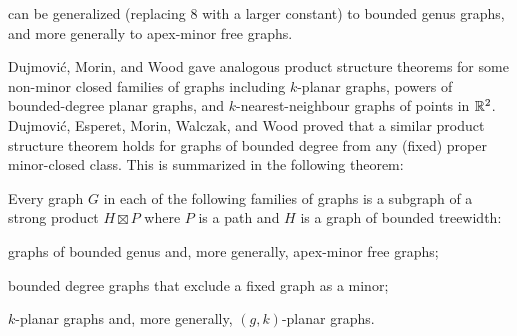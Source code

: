 \documentclass[kpfonts]{patmorin}
\begin{document}
 can be generalized (replacing $8$ with a larger constant) to bounded genus graphs, and more generally to apex-minor free graphs.


Dujmović, Morin, and Wood \cite{dujmovic.morin.ea:structure} gave analogous product structure theorems for some non-minor closed families of graphs including $k$-planar graphs,
powers of bounded-degree planar graphs, and $k$-nearest-neighbour graphs of points in $\mathbb{R}^2$. Dujmović, Esperet, Morin, Walczak, and Wood \cite{dujmovic.esperet.ea:clustered} proved that a similar product structure theorem holds for graphs of bounded degree from any (fixed) proper minor-closed class.  This is summarized in the following theorem:

\begin{thm}
   Every graph $G$ in each of the following families of graphs is a subgraph of a
strong product $H\boxtimes P$ where $P$ is a path and $H$ is a graph of bounded
treewidth:

   \begin{compactitem}
   \item graphs of bounded genus and, more generally, apex-minor free graphs;%
     \item bounded degree graphs that exclude a fixed graph as
a minor;%
   \item $k$-planar graphs and, more generally, $(g,k)$-planar graphs. %
 \end{compactitem}
\end{thm}
\end{document}
